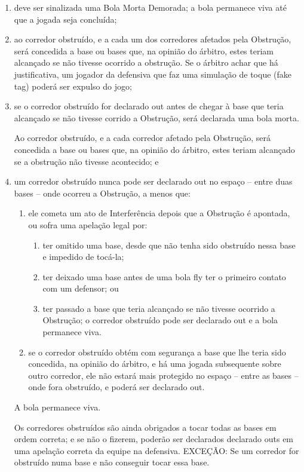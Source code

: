 \begin{enumerate}[label=(\alph*)]\item   deve ser sinalizada uma Bola Morta Demorada; a bola permanece viva até que a jogada seja concluída;
	\item  ao corredor obstruído, e a cada um dos corredores afetados pela Obstrução, será concedida a base ou bases que, na opinião do árbitro, estes teriam alcançado se não tivesse ocorrido a obstrução. Se o árbitro achar que há justificativa, um jogador da defensiva que faz uma simulação de toque (\gls{fake tag}) poderá ser expulso do jogo;

	\item  se o corredor obstruído for declarado \gls{out} antes de chegar à base que teria alcançado se não tivesse corrido a Obstrução, será declarada uma bola morta.

	Ao corredor obstruído, e a cada corredor afetado pela Obstrução, será concedida a base ou bases que, na opinião do árbitro, estes teriam alcançado se a obstrução não tivesse acontecido; e
	\item  um corredor obstruído nunca pode ser declarado \gls{out} no espaço -- entre duas bases -- onde ocorreu a Obstrução, a menos que:

	\begin{enumerate}[label=\roman*.]
		\item ele cometa um ato de Interferência depois que a Obstrução é apontada, ou sofra uma apelação legal por:

		\begin{enumerate}[label=\arabic*)]
			\item ter omitido uma base, desde que não tenha sido obstruído nessa base e impedido de tocá-la;
			\item ter deixado uma base antes de uma bola \gls{fly} ter o primeiro contato com um defensor; ou
			\item ter passado a base que teria alcançado se não tivesse ocorrido a  Obstrução; o corredor obstruído pode ser declarado \gls{out} e a bola permanece viva.
		\end{enumerate}
		\item se o corredor obstruído obtém com segurança a base que lhe teria sido concedida, na opinião do árbitro, e há uma jogada subsequente sobre outro corredor, ele não estará mais protegido no espaço -- entre as bases -- onde fora  obstruído, e poderá ser declarado \gls{out}.
	\end{enumerate}

	A bola permanece viva.

	Os corredores  obstruídos são ainda obrigados a tocar todas as bases em ordem correta; e se  não o fizerem, poderão ser declarados declarado \gls{out}s em uma apelação correta da equipe na defensiva. EXCEÇÃO: Se um corredor for obstruído numa base e não conseguir tocar essa base.

\end{enumerate}


